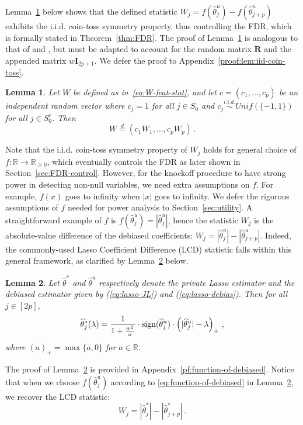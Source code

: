 \documentclass[11pt]{article}
\newtheorem{lemma}{Lemma}%
\newcommand{\bI}{\boldsymbol{I}}
\newcommand{\bR}{\boldsymbol{R}}
\newcommand{\mbR}{\mathbb{R}}
\newcommand{\sign}{{\rm sign}}
\newcommand{\hth}{\widehat{\theta}}
\begin{document}
Lemma~\ref{lem:iid-coin-toss} below shows that the defined statistic $W_j = f(\hth^u_j)-f(\hth^u_{j+p})$ exhibits the i.i.d. coin-toss symmetry property, thus controlling the FDR, which is formally stated in Theorem~\ref{thm:FDR}. The proof of Lemma~\ref{lem:iid-coin-toss} is analogous to that of \cite[Lemma 3.3]{candes2017panning} and \cite[Lemma 1]{Barber_2015}, but must be adapted to account for the random matrix $\bR$ and the appended matrix $w\bI_{2p+1}$. We defer the proof to Appendix~\ref{proof:lem:iid-coin-toss}.
\begin{lemma}\label{lem:iid-coin-toss} 
    Let $W$ be defined as in~\eqref{eq:W-feat-stat}, and let $c=(c_1,\dotsc,c_p)$ be an independent random vector where $c_j=1$ for all $j\in S_0$ and $c_j\stackrel{i.i.d.}{\sim}Unif(\{-1,1\})$ for all $j \in S_0^c$. Then
    \[
    W\stackrel{d}{=}(c_1W_1,\dotsc,c_pW_p)\,.
    \]
\end{lemma}
Note that the i.i.d. coin-toss symmetry property of $W_j$ holds for general choice of $f:\mbR\to\mbR_{\ge 0}$, which eventually controls the FDR as later shown in Section~\ref{sec:FDR-control}. However, for the knockoff procedure to have strong power in detecting non-null variables, we need extra assumptions on $f$. For example, $f(x)$ goes to infinity when $|x|$ goes to infinity. We defer the rigorous assumptions of $f$ needed for power analysis to Section~\ref{sec:utility}. A straightforward example of $f$ is $f(\hth^u_j) = |\hth^u_j|$, hence the statistic $W_j$ is the absolute-value difference of the debiased coefficients: $W_j = |\hth^u_j|-|\hth^u_{j+p}|$. Indeed, the commonly-used Lasso Coefficient Difference (LCD) statistic falls within this general framework, as clarified by Lemma~\ref{lem:function-of-debiased} below.
\begin{lemma}\label{lem:function-of-debiased}
    Let $\hth^*$ and $\hth^u$ respectively denote the private Lasso estimator and the debiased estimator given by  (\ref{eq:lasso-JL}) and (\ref{eq:lasso-debias}). Then for all $j\in[2p]$,
    \begin{equation}\label{eq:function-of-debiased}
        \hth^*_j(\lambda) =\frac{1}{1+ \frac{w^2}{  n}}\cdot \sign(\hth^u_j)\cdot\left(|\hth^u_j|-\lambda\right)_+\,,
    \end{equation}
    where $(a)_+ = \max\{a,0\}$ for $a\in\mbR$.
\end{lemma}
The proof of Lemma~\ref{lem:function-of-debiased} is provided in Appendix~\ref{pf:function-of-debiased}. Notice that when we choose $f(\hth^u_j)$ according to \eqref{eq:function-of-debiased} in Lemma~\ref{lem:function-of-debiased}, we recover the LCD statistic: 
\[
W_j = |\hth^*_j|-|\hth^*_{j+p}|\,.
\]
\end{document}
